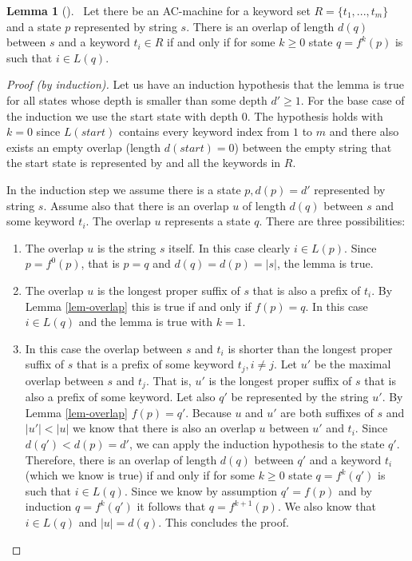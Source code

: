 \documentclass[english,twoside,censored,csm,algorithms-track-2020]{HYthesisML}
\theoremstyle{plain}
\theoremstyle{definition}
\newtheorem{lemma}[theorem]{Lemma}
\begin{document}


\begin{lemma}[]~\label{lem-overlap-length}
  Let there be an AC-machine for a keyword set $R=\{t_1,...,t_m\}$ and a state $p$ represented
  by string $s$.
  There is an overlap of length $d(q)$ between $s$ and a keyword $t_i\in R$ if and only if
  for some $k \geq 0$ state $q=f^k(p)$ is such that $i\in L(q)$.
\end{lemma}
\begin{proof}[Proof (by induction)]
  Let us have an induction hypothesis that the lemma is true for all states whose depth is
  smaller than some depth $d'\geq 1$. For the base case of the induction we use the start state
  with depth 0. The hypothesis holds
  with $k=0$ since $L(start)$ contains every keyword index from $1$ to $m$ and there also exists an empty
  overlap (length $d(start)=0$) between the empty string that the start state is represented by and all
  the keywords in $R$.

  In the induction step we assume there is a state $p, d(p) = d'$ represented by string $s$.
  Assume also that there is an overlap $u$ of length $d(q)$ between $s$ and some keyword $t_i$. The
  overlap $u$ represents a state $q$.
  There are three possibilities:
  \begin{enumerate}[leftmargin=28pt]
  \item The overlap $u$ is the string $s$ itself. In this case clearly $i\in L(p)$. Since
    $p=f^0(p)$, that is $p=q$ and $d(q) = d(p) = |s|$, the lemma is true. 
  \item The overlap $u$ is the longest proper suffix of $s$ that is also a prefix of $t_i$.
    By Lemma \ref{lem-overlap} this is true if and only if $f(p) = q$. In this case
    $i\in L(q)$ and the lemma is true with $k=1$.
  \item In this case the overlap between $s$ and $t_i$ is shorter than the longest proper
    suffix of $s$ that is a prefix of some keyword $t_j, i\neq j$. Let $u'$ be the maximal
    overlap between $s$ and $t_j$. That is, $u'$ is the longest proper suffix of $s$ that is also
    a prefix of some keyword. Let also $q'$ be represented by the string $u'$. By Lemma
    \ref{lem-overlap} $f(p) = q'$. Because $u$ and $u'$ are both suffixes of $s$ and $|u'|<|u|$ we
    know that there is also an overlap $u$ between $u'$ and $t_i$. Since $d(q') < d(p) = d'$, we can
    apply the induction hypothesis to the state $q'$. Therefore, there is an overlap of length
    $d(q)$ between $q'$ and a keyword $t_i$ (which we know is true) if and only if for some
    $k \geq 0$ state $q=f^k(q')$ is such that $i\in L(q)$. Since we know by assumption $q'=f(p)$ and
    by induction $q=f^k(q')$ it follows that $q=f^{k+1}(p)$. We also know that $i\in L(q)$ and
    $|u|=d(q)$. This concludes the proof.
    

\end{enumerate}
\end{proof}
\end{document}
